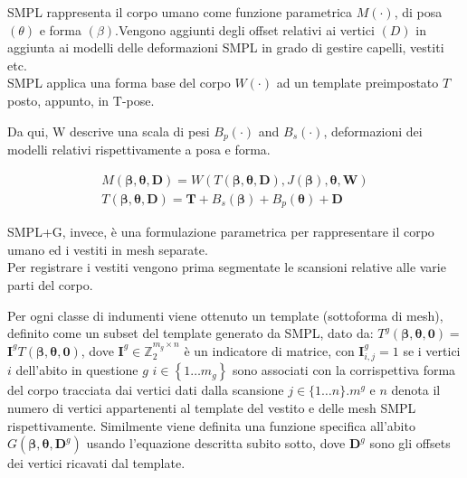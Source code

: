 \medskip

SMPL rappresenta il corpo umano come funzione parametrica $M(\cdot)$, di posa $(\theta)$ e forma $(\beta)$.Vengono aggiunti degli offset relativi ai vertici $(D)$ in aggiunta ai modelli delle deformazioni SMPL in grado di gestire capelli, vestiti etc.\\
SMPL applica una forma base del corpo $W(\cdot)$ ad un template preimpostato $T$ posto, appunto, in T-pose.

\medskip

Da qui, W descrive una scala di pesi $B_{p}(\cdot)$ and $B_{s}(\cdot)$, deformazioni dei modelli relativi rispettivamente a posa e forma.

\medskip

\begin{equation*}
\begin{gathered}
M(\boldsymbol{\beta}, \boldsymbol{\theta}, \mathbf{D})=W(T(\boldsymbol{\beta}, \boldsymbol{\theta}, \mathbf{D}), J(\boldsymbol{\beta}), \boldsymbol{\theta}, \mathbf{W}) \\
T(\boldsymbol{\beta}, \boldsymbol{\theta}, \mathbf{D})=\mathbf{T}+B_{s}(\boldsymbol{\beta})+B_{p}(\boldsymbol{\theta})+\mathbf{D}
\end{gathered}
\end{equation*}

\medskip

SMPL+G, invece, è una formulazione parametrica per rappresentare il corpo umano ed i vestiti in mesh separate.\\
Per registrare i vestiti vengono prima segmentate le scansioni relative alle varie parti del corpo.

\medskip

Per ogni classe di indumenti viene ottenuto un template (sottoforma di mesh), definito come un subset del template generato da SMPL, dato da: $T^{g}(\boldsymbol{\beta}, \boldsymbol{\theta}, \boldsymbol{0})=$ $\mathbf{I}^{g} T(\boldsymbol{\beta}, \boldsymbol{\theta}, \mathbf{0})$, dove $\mathbf{I}^{g} \in \mathbb{Z}_{2}^{m_{g} \times n}$ è un indicatore di matrice, con $\mathbf{I}_{i, j}^{g}=1$ se i vertici $i$ dell'abito in questione $g$ $i \in\left\{1 \ldots m_{g}\right\}$ sono associati con la corrispettiva forma del corpo tracciata dai vertici dati dalla scansione $j \in\{1 \ldots n\} . m^{g}$ e $n$ denota il numero di vertici appartenenti al template del vestito e delle mesh SMPL rispettivamente. Similmente viene definita una funzione specifica all'abito $G\left(\boldsymbol{\beta}, \boldsymbol{\theta}, \mathbf{D}^{g}\right)$ usando l'equazione descritta subito sotto, dove $\mathbf{D}^{g}$ sono gli offsets dei vertici ricavati dal template.

